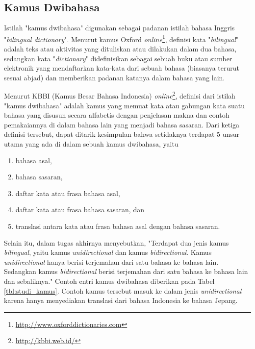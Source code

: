 \documentclass[../main/main.tex]{subfiles}
\begin{document}

\subsection{Kamus Dwibahasa}
\label{subbab:studi_kamus}
Istilah "kamus dwibahasa" digunakan sebagai padanan istilah bahasa Inggris "\textit{bilingual dictionary}". Menurut kamus Oxford \textit{online}\footnote{\url{http://www.oxforddictionaries.com}}, definisi kata "\textit{bilingual}" adalah teks atau aktivitas yang dituliskan atau dilakukan dalam dua bahasa, sedangkan kata "\textit{dictionary}" didefinisikan sebagai sebuah buku atau sumber elektronik yang mendaftarkan kata-kata dari sebuah bahasa (biasanya terurut sesuai abjad) dan memberikan padanan katanya dalam bahasa yang lain.

Menurut KBBI (Kamus Besar Bahasa Indonesia) \textit{online}\footnote{\url{http://kbbi.web.id/}}, definisi dari istilah "kamus dwibahasa" adalah kamus yang memuat kata atau gabungan kata suatu bahasa yang disusun secara alfabetis dengan penjelasan makna dan contoh pemakaiannya di dalam bahasa lain yang menjadi bahasa sasaran. Dari ketiga definisi tersebut, dapat ditarik kesimpulan bahwa setidaknya terdapat 5 unsur utama yang ada di dalam sebuah kamus dwibahasa, yaitu
\begin{enumerate}
\item bahasa asal,
\item bahasa sasaran,
\item daftar kata atau frasa bahasa asal,
\item daftar kata atau frasa bahasa sasaran, dan
\item translasi antara kata atau frasa bahasa asal dengan bahasa sasaran.
\end{enumerate}

Selain itu, \textcite{limanthie} dalam tugas akhirnya menyebutkan, "Terdapat dua jenis kamus \textit{bilingual}, yaitu kamus \textit{unidirectional} dan kamus \textit{bidirectional}. Kamus \textit{unidirectional} hanya berisi terjemahan dari satu bahasa ke bahasa lain. Sedangkan kamus \textit{bidirectional} berisi terjemahan dari satu bahasa ke bahasa lain dan sebaliknya." Contoh entri kamus dwibahasa diberikan pada Tabel \ref{tbl:studi_kamus}. Contoh kamus tersebut masuk ke dalam jenis \textit{unidirectional} karena hanya menyediakan translasi dari bahasa Indonesia ke bahasa Jepang.
\end{document}
